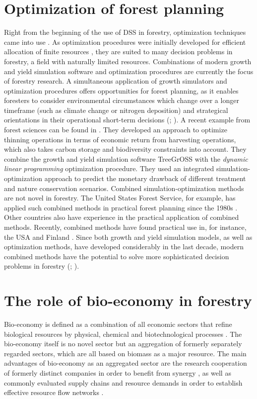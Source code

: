 \section{Optimization of forest planning}
\label{sec:intro:opt}
Right from the beginning of the use of DSS in forestry, optimization techniques came into use \citep[p. 16]{kangas_2015}. As optimization procedures were initially developed for efficient allocation of finite resources \citep[p. 271]{davis_2001}, they are suited to many decision problems in forestry, a field with naturally limited resources. Combinations of modern growth and yield simulation software and optimization procedures are currently the focus of forestry research. A simultaneous application of growth simulators and optimization procedures offers opportunities for forest planning, as it enables foresters to consider environmental circumstances which change over a longer timeframe (such as climate change or nitrogen deposition) and strategical orientations in their operational short-term decisions (\citealp[p. 346-347]{mohring_2010}; \citealp[p. 1081]{pretzsch_2008}). A recent example from forest sciences can be found in \citet{yousefpour_2009}. They developed an approach to optimize thinning operations in terms of economic return from harvesting operations, which also takes carbon storage and biodiversity constraints into account. They combine the growth and yield simulation software TreeGrOSS with the \textit{dynamic linear programming} optimization procedure. They used an integrated si\-mu\-la\-tion-op\-ti\-mi\-za\-tion approach to predict the monetary drawback of different treatment and nature conservation scenarios. Combined si\-mu\-la\-tion-op\-ti\-mi\-za\-tion methods are not novel in forestry. The United States Forest Service, for example, has applied such combined methods in practical forest planning since the 1980s \citep[p. 33]{hoganson_2015}. Other countries also have experience in the practical application of combined methods. Recently, combined methods have found practical use in, for instance, the USA and Finland \citep[p. 41]{hoganson_2015}. Since both growth and yield simulation models, as well as optimization methods, have developed considerably in the last decade, modern combined methods have the potential to solve more sophisticated decision problems in forestry (\citealp[p. 16-17]{kangas_2015}; \citealp[p. 93]{muys_2010}).

\section{The role of bio-economy in forestry}
\label{sec:intro:biecon}
Bio-economy is defined as a combination of all economic sectors that refine biological resources by physical, chemical and biotechnological processes \citep[p. 10462]{debesi_2015}. The bio-economy itself is no novel sector but an aggregation of formerly separately regarded sectors, which are all based on biomass as a major resource. The main advantages of bio-economy as an aggregated sector are the research cooperation of formerly distinct companies in order to benefit from synergy \citep[p. 1]{auer_2016}, as well as commonly evaluated supply chains and resource demands in order to establish effective resource flow networks \citep[p. 3]{geldermann_2016}.

